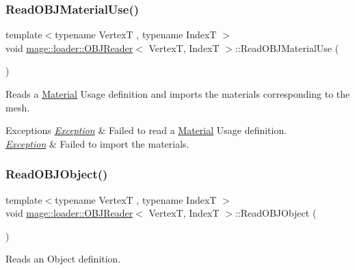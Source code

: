 \subsubsection{\texorpdfstring{Read\+O\+B\+J\+Material\+Use()}{ReadOBJMaterialUse()}}
{\footnotesize\ttfamily template$<$typename VertexT , typename IndexT $>$ \\
void \hyperlink{classmage_1_1loader_1_1_o_b_j_reader}{mage\+::loader\+::\+O\+B\+J\+Reader}$<$ VertexT, IndexT $>$\+::Read\+O\+B\+J\+Material\+Use (\begin{DoxyParamCaption}{ }\end{DoxyParamCaption})\hspace{0.3cm}{\ttfamily [private]}}

Reads a \hyperlink{classmage_1_1_material}{Material} Usage definition and imports the materials corresponding to the mesh.


\begin{DoxyExceptions}{Exceptions}
{\em \hyperlink{classmage_1_1_exception}{Exception}} & Failed to read a \hyperlink{classmage_1_1_material}{Material} Usage definition. \\
\hline
{\em \hyperlink{classmage_1_1_exception}{Exception}} & Failed to import the materials. \\
\hline
\end{DoxyExceptions}
\hypertarget{classmage_1_1loader_1_1_o_b_j_reader_ab68b5743b7a97a2d9e0c5e58d32fc9b8}{}\label{classmage_1_1loader_1_1_o_b_j_reader_ab68b5743b7a97a2d9e0c5e58d32fc9b8} 
\subsubsection{\texorpdfstring{Read\+O\+B\+J\+Object()}{ReadOBJObject()}}
{\footnotesize\ttfamily template$<$typename VertexT , typename IndexT $>$ \\
void \hyperlink{classmage_1_1loader_1_1_o_b_j_reader}{mage\+::loader\+::\+O\+B\+J\+Reader}$<$ VertexT, IndexT $>$\+::Read\+O\+B\+J\+Object (\begin{DoxyParamCaption}{ }\end{DoxyParamCaption})\hspace{0.3cm}{\ttfamily [private]}}

Reads an Object definition.


